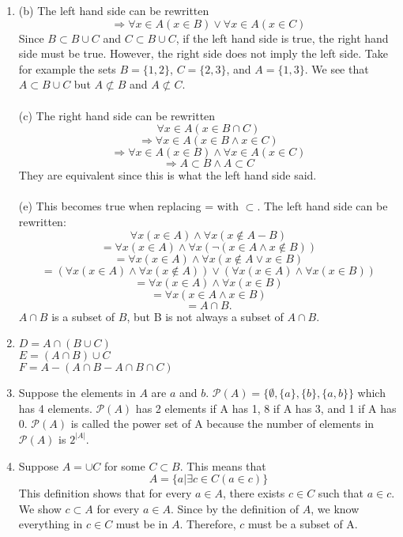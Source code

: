 \documentclass{article}
\begin{document}
\begin{enumerate}
\item 
(b) The left hand side can be rewritten $$\Rightarrow \forall x \in A(x\in B) \vee \forall x \in A(x \in C)$$ Since $B \subset B \cup C$ and $C \subset B\cup C$, if the left hand side is true, the right hand side must be true. However, the right side does not imply the left side. Take for example the sets $B = \{1,2\}$, $C = \{2,3\}$, and $A=\{1,3\}$. We see that $A\subset B \cup C$ but $A \not\subset B$ and $A\not\subset C$.
\\\\(c) The right hand side can be rewritten $$\forall x \in A(x\in B\cap C)$$ $$\Rightarrow \forall x \in A(x \in B \wedge x \in C)$$ 
$$\Rightarrow \forall x \in A(x\in B) \wedge \forall x \in A(x \in C)$$ $$ \Rightarrow A \subset B \wedge A \subset C$$
They are equivalent since this is what the left hand side said. 
\\\\(e) This becomes true when replacing = with $\subset$. The left hand side can be rewritten: $$\forall x(x\in A) \wedge \forall x(x \not\in A - B)$$
$$ = \forall x(x\in A) \wedge \forall x(\neg(x\in A \wedge x\not\in B))$$
$$ = \forall x(x\in A) \wedge \forall x(x\not\in A \vee x\in B)$$
$$ = (\forall x(x\in A) \wedge \forall x(x\not\in A)) \vee (\forall x(x\in A) \wedge \forall x(x\in B))$$
$$ = \forall x(x\in A) \wedge \forall x(x\in B)$$
$$ = \forall x(x\in A \wedge x\in B)$$
$$ = A \cap B.$$
$A \cap B$ is a subset of $B$, but B is not always a subset of $A \cap B$.

\item
$D = A \cap (B \cup C)$
\\ $E = (A\cap B) \cup C$
\\ $F = A - (A\cap B - A \cap B \cap C)$

\item
Suppose the elements in $A$ are $a$ and $b$. $\mathcal{P}(A)=\{\emptyset , \{a\}, \{b\}, \{a,b\}\}$ which has 4 elements. $\mathcal{P}(A)$ has 2 elements if A has 1, 8 if A has 3, and 1 if A has 0. $\mathcal{P}(A)$ is called the power set of A because the number of elements in $\mathcal{P}(A)$ is $2^{|A|}$.

\item
Suppose $A = \cup C$ for some $C \subset B$. This means that $$A = \{a | \exists c \in C(a\in c)\}$$ This definition shows that for every $a \in A$, there exists $c \in C$ such that $a\in c$. We show $c \subset A$ for every $a \in A$. Since by the definition of $A$, we know everything in $c \in C$ must be in $A$. Therefore, $c$ must be a subset of A. 



\end{enumerate}
\end{document}
